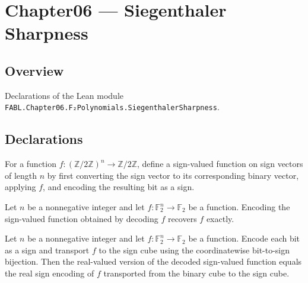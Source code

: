 \chapter{Chapter06 — Siegenthaler Sharpness}
\section{Overview}

Declarations of the Lean module \texttt{FABL.Chapter06.F₂Polynomials.SiegenthalerSharpness}.

\section{Declarations}

\begin{definition}
\leanok
{}
For a function $f:(\mathbb{Z}/2\mathbb{Z})^n\to\mathbb{Z}/2\mathbb{Z}$, define a
sign-valued function on sign vectors of length $n$ by first converting the sign vector
to its corresponding binary vector, applying $f$, and encoding the resulting bit as a
sign.
\end{definition}

\begin{theorem}
\leanok
{}
Let $n$ be a nonnegative integer and let $f:\mathbb F_2^n\to\mathbb F_2$ be a function.
Encoding the sign-valued function obtained by decoding $f$ recovers $f$ exactly.
\end{theorem}

\begin{theorem}
\leanok
{}
Let $n$ be a nonnegative integer and let $f:\mathbb F_2^n\to\mathbb F_2$ be a function.
Encode each bit as a sign and transport $f$ to the sign cube using the coordinatewise
bit-to-sign bijection. Then the real-valued version of the decoded sign-valued function
equals the real sign encoding of $f$ transported from the binary cube to the sign cube.
\end{theorem}

